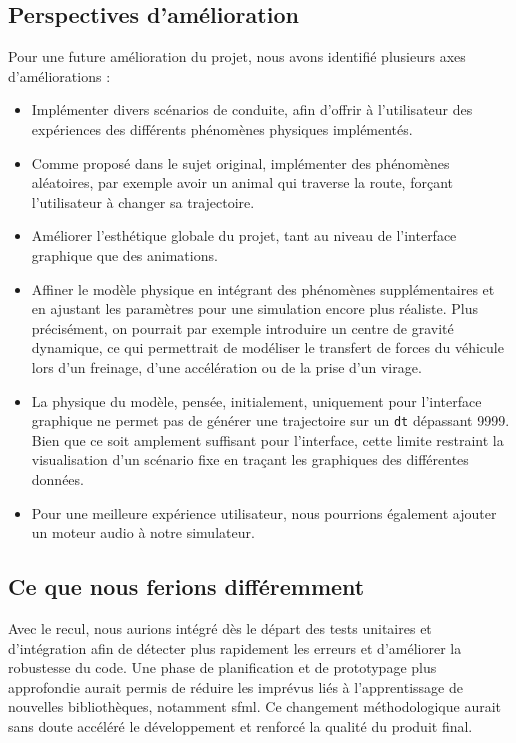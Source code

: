 \subsection{Perspectives d'amélioration}\label{subsec:perspectives-d'ameliorations}
Pour une future amélioration du projet, nous avons identifié plusieurs axes d'améliorations :
\begin{itemize}
    \item Implémenter divers scénarios de conduite, afin d'offrir à l'utilisateur des expériences des différents phénomènes physiques implémentés.
    \item Comme proposé dans le sujet original, implémenter des phénomènes aléatoires, par exemple avoir un animal qui traverse la route, forçant l'utilisateur à changer sa trajectoire.
    \item Améliorer l'esthétique globale du projet, tant au niveau de l'interface graphique que des animations.
    \item Affiner le modèle physique en intégrant des phénomènes supplémentaires et en ajustant les paramètres pour une simulation encore plus réaliste.
    Plus précisément, on pourrait par exemple introduire un centre de gravité dynamique, ce qui permettrait de modéliser le transfert de forces du véhicule lors d'un freinage, d'une accélération ou de la prise d'un virage.
    \item La physique du modèle, pensée, initialement, uniquement pour l'interface graphique ne permet pas de générer une trajectoire sur un \texttt{dt} dépassant 9999.
    Bien que ce soit amplement suffisant pour l'interface, cette limite restraint la visualisation d'un scénario fixe en traçant les graphiques des différentes données.
    \item Pour une meilleure expérience utilisateur, nous pourrions également ajouter un moteur audio à notre simulateur.

\end{itemize}

\subsection{Ce que nous ferions différemment}\label{subsec:ce-que-nous-ferions-differemment}
Avec le recul, nous aurions intégré dès le départ des tests unitaires et d'intégration afin de détecter plus rapidement les erreurs et d'améliorer la robustesse du code.
Une phase de planification et de prototypage plus approfondie aurait permis de réduire les imprévus liés à l'apprentissage de nouvelles bibliothèques, notamment \gls{sfml}\@.
Ce changement méthodologique aurait sans doute accéléré le développement et renforcé la qualité du produit final.

